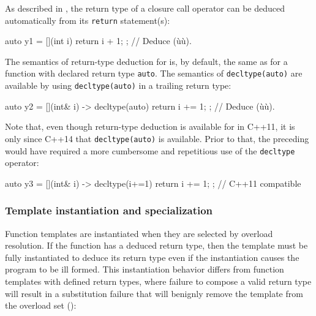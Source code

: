 As described in , the return type of a closure call
operator can be deduced automatically from its \lstinline!return!
statement(s):

\begin{emcppslisting}[emcppsstandards={c++14}]
auto y1 = [](int i) { return i + 1; };  // Deduce (ù{}ù).
\end{emcppslisting}
    

\noindent The semantics of return-type deduction for 
is, by default, the same as for a function with declared return type
\lstinline!auto!. The semantics of \lstinline!decltype(auto)! are available by
using \lstinline!decltype(auto)! in a trailing return type:

\begin{emcppslisting}[emcppsstandards={c++14}]
auto y2 = [](int& i) -> decltype(auto) { return i += 1; };  // Deduce (ù{}ù).
\end{emcppslisting}
    

\noindent Note that, even though return-type deduction is available for
 in C++11, it is only since C++14 that
\lstinline!decltype(auto)! is available. Prior to that, the preceding
 would have required a more cumbersome and
repetitious use of the \lstinline!decltype! operator:

\begin{emcppslisting}[emcppsstandards={c++14}]
auto y3 = [](int& i) -> decltype(i+=1) { return i += 1; };  // C++11 compatible
\end{emcppslisting}
    

\subsubsection[Template instantiation and specialization]{Template instantiation and specialization}\label{template-instantiation-and-specialization}

Function templates are instantiated when they are selected by overload
resolution. If the function has a deduced return type, then the template
must be fully instantiated to deduce its return type even if the
instantiation causes the program to be ill formed. This instantiation
behavior differs from function templates with defined return types,
where failure to compose a valid return type will result in a
substitution failure that will benignly remove the template from the
overload set ():


